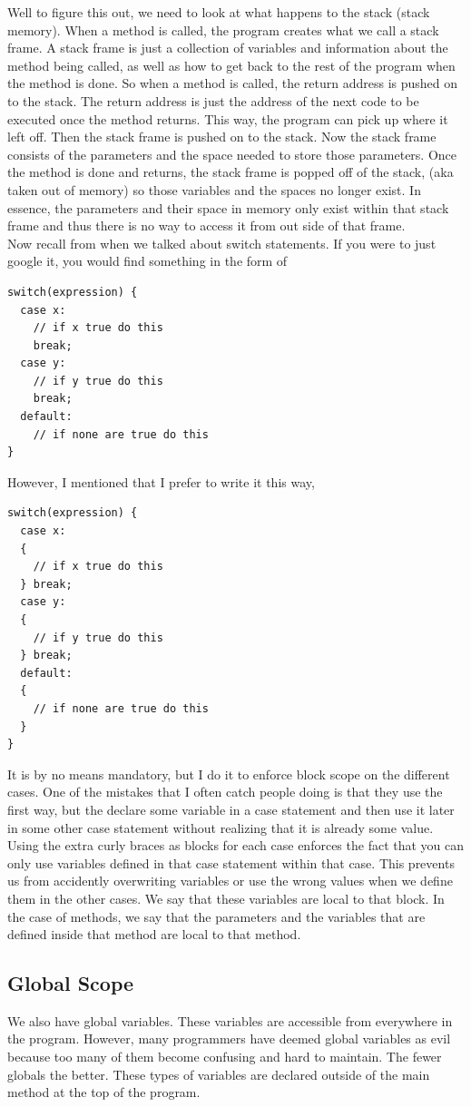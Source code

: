 \documentclass[11]{article}
\begin{document}
Well to figure this out, we need to look at what happens to the stack (stack memory). When a method is called, the program creates what we call a stack frame. A stack frame is just a collection of variables and information about the method being called, as well as how to get back to the rest of the program when the method is done. So when a method is called, the return address is pushed on to the stack. The return address is just the address of the next code to be executed once the method returns. This way, the program can pick up where it left off. Then the stack frame is pushed on to the stack. Now the stack frame consists of the parameters and the space needed to store those parameters. Once the method is done and returns, the stack frame is popped off of the stack, (aka taken out of memory) so those variables and the spaces no longer exist. In essence, the parameters and their space in memory only exist within that stack frame and thus there is no way to access it from out side of that frame.\\

Now recall from when we talked about switch statements. If you were to just google it, you would find something in the form of

\begin{lstlisting}
switch(expression) {
  case x:
    // if x true do this
    break;
  case y:
    // if y true do this
    break;
  default:
    // if none are true do this
}
\end{lstlisting}

However, I mentioned that I prefer to write it this way, 
\begin{lstlisting}
switch(expression) {
  case x:
  {
    // if x true do this
  } break;
  case y:
  {
    // if y true do this
  } break;
  default:
  {
    // if none are true do this
  }
}
\end{lstlisting}

It is by no means mandatory, but I do it to enforce block scope on the different cases. One of the mistakes that I often catch people doing is that they use the first way, but the declare some variable in a case statement and then use it later in some other case statement without realizing that it is already some value. Using the extra curly braces as blocks for each case enforces the fact that you can only use variables defined in that case statement within that case. This prevents us from accidently overwriting variables or use the wrong values when we define them in the other cases. We say that these variables are local to that block. In the case of methods, we say that the parameters and the variables that are defined inside that method are local to that method.\\
\subsection{Global Scope}
We also have global variables. These variables are accessible from everywhere in the program. However, many programmers have deemed global variables as evil because too many of them become confusing and hard to maintain. The fewer globals the better. These types of variables are declared outside of the main method at the top of the program.
\end{document}

